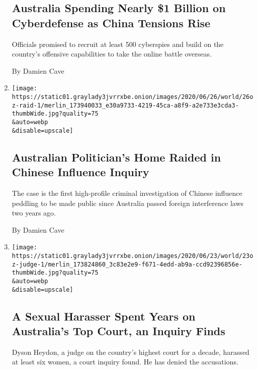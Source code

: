 \begin{enumerate}
{  \subsection{Australia Spending Nearly \$1 Billion on Cyberdefense as
  China Tensions
  Rise}\label{australia-spending-nearly-1-billion-on-cyberdefense-as-china-tensions-rise}}

  Officials promised to recruit at least 500 cyberspies and build on the
  country's offensive capabilities to take the online battle overseas.

  By Damien Cave
\item
  \href{/2020/06/26/world/australia/politician-home-raid-china-influence.html}{}

  \texttt{[image: https://static01.graylady3jvrrxbe.onion/images/2020/06/26/world/26oz-raid-1/merlin\_173940033\_e30a9733-4219-45ca-a8f9-a2e733e3cda3-thumbWide.jpg?quality=75\\\&auto=webp\\\&disable=upscale]}

  \hypertarget{australian-politicians-home-raided-in-chinese-influence-inquiry}{%
  \subsection{Australian Politician's Home Raided in Chinese Influence
  Inquiry}\label{australian-politicians-home-raided-in-chinese-influence-inquiry}}

  The case is the first high-profile criminal investigation of Chinese
  influence peddling to be made public since Australia passed foreign
  interference laws two years ago.

  By Damien Cave
\item
  \href{/2020/06/23/world/australia/dyson-heydon-high-court-metoo.html}{}

  \texttt{[image: https://static01.graylady3jvrrxbe.onion/images/2020/06/23/world/23oz-judge-1/merlin\_173824860\_3c83e2e9-f671-4edd-ab9a-ccd92396856e-thumbWide.jpg?quality=75\\\&auto=webp\\\&disable=upscale]}

  \hypertarget{a-sexual-harasser-spent-years-on-australias-top-court-an-inquiry-finds}{%
  \subsection{A Sexual Harasser Spent Years on Australia's Top Court, an
  Inquiry
  Finds}\label{a-sexual-harasser-spent-years-on-australias-top-court-an-inquiry-finds}}

  Dyson Heydon, a judge on the country's highest court for a decade,
  harassed at least six women, a court inquiry found. He has denied the
  accusations.


\end{enumerate}
